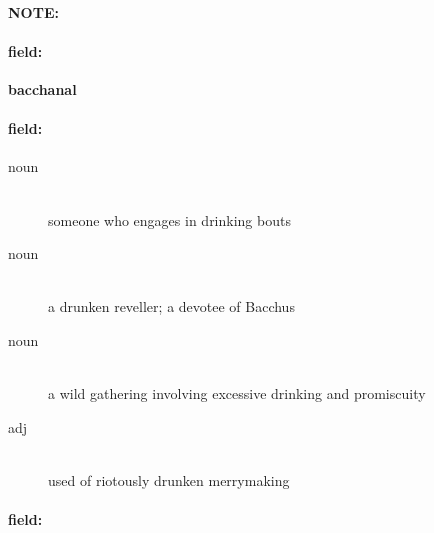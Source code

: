 \documentclass[12pt]{article}
\newenvironment{note}{\paragraph{NOTE:}}{}
\newenvironment{field}{\paragraph{field:}}{}
\begin{document}
\begin{note}
\begin{field}
\textbf{\large bacchanal}
\end{field}


\begin{field}
\begin{description}
\item[noun] \hfill \\ 
someone who engages in drinking bouts

\item[noun] \hfill \\ 
a drunken reveller; a devotee of Bacchus

\item[noun] \hfill \\ 
a wild gathering involving excessive drinking and promiscuity

\item[adj] \hfill \\ 
used of riotously drunken merrymaking

\end{description}
\end{field}

\begin{field}
\end{field}
\end{note}
\end{document}
